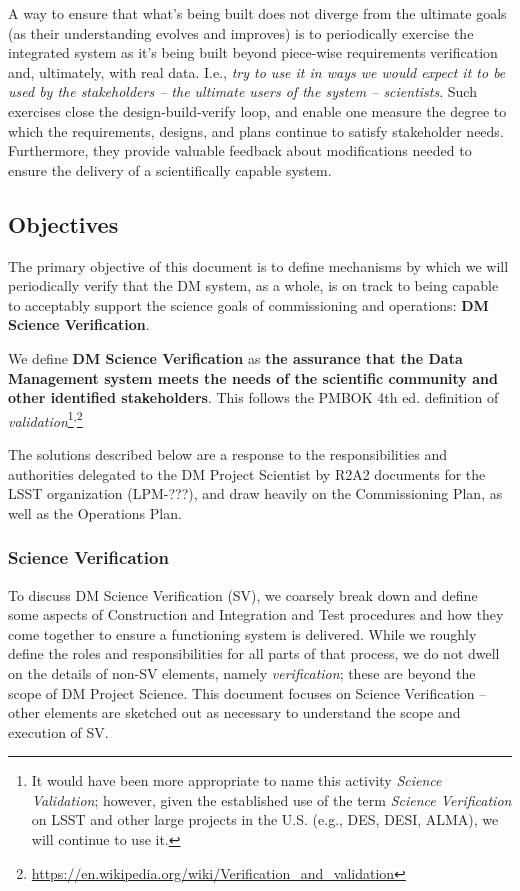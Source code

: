 A way to ensure that what's being built does not diverge from the ultimate goals
(as their understanding evolves and improves) is to periodically
exercise the integrated system as it's being built beyond piece-wise requirements
verification and, ultimately, with real data.  I.e., {\em
try to use it in ways we would expect it to be used by the stakeholders -- the
ultimate users of the system -- scientists}.  Such exercises close the
design-build-verify loop, and enable one measure the degree to which the
requirements, designs, and plans continue to satisfy stakeholder needs. 
Furthermore, they provide valuable feedback about modifications needed to
ensure the delivery of a scientifically capable system.

\subsection{Objectives }

The primary objective of this document is to define mechanisms by which we
will periodically verify that the DM system, as a whole, is on track to
being capable to acceptably support the science goals of commissioning and
operations: {\bf DM Science Verification}.

We define  {\bf DM Science Verification} as {\bf the assurance that the Data
Management system meets the needs of the scientific community and other
identified stakeholders}.  This follows the PMBOK 4th ed.  definition of
{\em validation}\footnote{It would have been more appropriate to name
this activity {\em Science Validation}; however, given the established use of
the term {\em Science Verification} on LSST and other large projects in the
U.S.  (e.g., DES, DESI, ALMA), we will continue to use
it.}\textsuperscript{,}\footnote{\url{https://en.wikipedia.org/wiki/Verification_and_validation}}

The solutions described below are a response to the responsibilities and
authorities delegated to the DM Project Scientist by R2A2 documents for the
LSST organization (LPM-???), and draw heavily on the Commissioning Plan, as
well as the Operations Plan.

\subsubsection{Science Verification}


To discuss DM Science Verification (SV), we coarsely break down and define
some aspects of Construction and Integration and Test procedures and how
they come together to ensure a functioning system is delivered.  While we
roughly define the roles and responsibilities for all parts of that process,
we do not dwell on the details of non-SV elements, namely {\em
verification}; these are beyond the scope of DM Project Science.  This
document focuses on Science Verification -- other elements are sketched out
as necessary to understand the scope and execution of SV.

